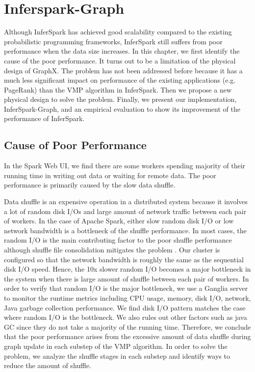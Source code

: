 \chapter{Inferspark-Graph}
\label{chap:graphengine}

Although InferSpark has achieved good scalability compared to the existing
probabilistic programming frameworks, InferSpark still suffers from poor
performance when the data size increases. In this
chapter, we first identify the cause of the poor performance. It turns out to be a
limitation of the physical design of GraphX. The problem has not been addressed
before because it has a much less significant impact on performance of the
existing applications (e.g. PageRank) than the VMP algorithm in InferSpark.
Then we propose a new physical design to solve the problem. Finally, we
present our implementation, InferSpark-Graph, and an empirical evaluation to
show its improvement of the performance of InferSpark.

\section{Cause of Poor Performance}
\label{sec:cause_poor_perf}

In the Spark Web UI, we find there are some workers spending majority of their 
running time in writing out data or waiting for remote data. The poor
performance is primarily caused by the slow data shuffle.

Data shuffle is an expensive operation in a distributed system because it
involves a lot of random disk I/Os and large amount of network traffic between each
pair of workers. In the case of Apache Spark, either slow random disk I/O or
low network bandwidth is a bottleneck of the shuffle performance. In most
cases, the random I/O is the main contributing factor to the poor shuffle
performance although shuffle file consolidation mitigates the problem
. Our cluster is configured so that the network
bandwidth is roughly the same as the sequential disk I/O speed. Hence, the 10x
slower random I/O becomes a major bottleneck in the system when there is large
amount of shuffle between each pair of workers.
In order to verify that random I/O is the major bottleneck, 
we use a Ganglia server to monitor the runtime metrics including CPU usage,
memory, disk I/O, network, Java garbage collection performance. We find disk
I/O pattern matches the case where random I/O is the bottleneck. We also rules
out other factors such as java GC since they do not take a majority of the
running time. Therefore, we conclude that the poor performance arises from the
excessive amount of data shuffle during graph update in each substep of the VMP
algorithm. In order to solve the problem, we analyze the shuffle stages in
each substep and identify ways to reduce the amount of shuffle.

